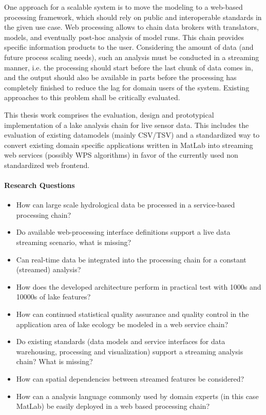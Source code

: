 	One approach for a scalable system is to move the modeling to a web-based processing framework, which should rely on public and interoperable standards in the given use case.
	Web processing allows to chain data brokers with translators, models, and eventually post-hoc analysis of model runs.
	This chain provides specific information products to the user.
	Considering the amount of data (and future process scaling needs), such an analysis must be conducted in a streaming manner, i.e. the processing should start before the last chunk of data comes in, and the output should also be available in parts before the processing has completely finished to reduce the lag for domain users of the system.
	Existing approaches to this problem shall be critically evaluated.

	This thesis work comprises the evaluation, design and prototypical implementation of a lake analysis chain for live sensor data.
	This includes the evaluation of existing datamodels (mainly CSV/TSV) and a standardized way to convert existing domain specific applications written in MatLab into streaming web services (possibly WPS algorithms) in favor of the currently used non standardized web frontend.

	\paragraph*{Research Questions}
	\begin{itemize}
		\item How can large scale hydrological data be processed in a service-based processing chain?
		\item Do available web-processing interface definitions support a live data streaming scenario, what is missing?
		\item Can real-time data be integrated into the processing chain for a constant (streamed) analysis?
		\item How does the developed architecture perform in practical test with 1000s and 10000s of lake features?
		\item How can continued statistical quality assurance and quality control in the application area of lake ecology be modeled in a web service chain?
		\item Do existing standards (data models and service interfaces for data warehousing, processing and visualization) support a streaming analysis chain? What is missing?
		\item How can spatial dependencies between streamed features be considered?
		\item How can a analysis language commonly used by domain experts (in this case MatLab) be easily deployed in a web based processing chain?
	\end{itemize}

